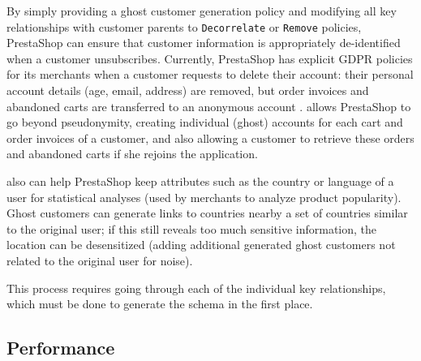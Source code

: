 By simply providing a ghost customer generation policy and modifying all key relationships with
customer parents to \texttt{Decorrelate} or \texttt{Remove} policies, PrestaShop can ensure that
customer information is appropriately de-identified when a customer unsubscribes.
Currently, PrestaShop has explicit GDPR policies for its merchants when a customer requests to delete
their account: their personal account details (age, email, address) are removed, but order invoices
and abandoned carts are transferred to an anonymous account
.
\sys allows PrestaShop to go beyond pseudonymity, creating individual (ghost) accounts for each
cart and order invoices of a customer, and also allowing a customer to retrieve these orders and
abandoned carts if she rejoins the application.

\sys also can help PrestaShop keep attributes such as the country or language of a user for
statistical analyses (used by merchants to analyze product popularity). Ghost customers can generate
links to countries nearby a set of countries similar to the original user; if this still reveals too
much sensitive information, the location can be desensitized (adding additional generated ghost
customers not related to the original user for noise).

This process requires going through each of the individual key relationships, which must be done to
generate the schema in the first place.

\subsection{Performance}


